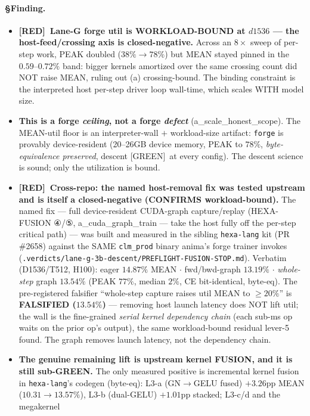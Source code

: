 \documentclass[11pt,a4paper]{article}
\providecommand{\tierGreen}{[GREEN]}
\providecommand{\tierRed}{[RED]}
\begin{document}
\paragraph{§Finding.}
\begin{itemize}\itemsep0.2em
\item \textbf{\tierRed\ Lane-G forge util is WORKLOAD-BOUND at $d1536$ --- the
host-feed/crossing axis is closed-negative.} Across an $8\times$ sweep of per-step
work, PEAK doubled ($38\%\to78\%$) but MEAN stayed pinned in the $0.59$--$0.72\%$
band: bigger kernels amortized over the same crossing count did NOT raise MEAN,
ruling out (a) crossing-bound. The binding constraint is the interpreted host
per-step driver loop wall-time, which scales WITH model size.
\item \textbf{This is a forge \emph{ceiling}, not a forge \emph{defect}}
(a\_scale\_honest\_scope). The MEAN-util floor is an interpreter-wall $+$
workload-size artifact: \texttt{forge} is provably device-resident (20--26GB device
memory, PEAK to $78\%$, \emph{byte-equivalence preserved}, descent \tierGreen\ at
every config). The descent science is sound; only the utilization is bound.
\item \textbf{\tierRed\ Cross-repo: the named host-removal fix was tested upstream
and is itself a closed-negative (CONFIRMS workload-bound).} The named fix --- full
device-resident CUDA-graph capture/replay (HEXA-FUSION ④/⑤,
a\_cuda\_graph\_train --- take the host fully off the per-step critical path) --- was
built and measured in the sibling \texttt{hexa-lang} kit (PR \#2658) against the SAME
\texttt{clm\_prod} binary anima's forge trainer invokes
(\texttt{.verdicts/lane-g-3b-descent/PREFLIGHT-FUSION-STOP.md}). Verbatim (D1536/T512,
H100): eager $14.87\%$ MEAN $\cdot$ fwd/bwd-graph $13.19\%$ $\cdot$ \emph{whole-step}
graph $13.54\%$ (PEAK $77\%$, median $2\%$, CE bit-identical, byte-eq). The
pre-registered falsifier ``whole-step capture raises util MEAN to $\ge20\%$'' is
\textbf{FALSIFIED ($13.54\%$)} --- removing host launch latency does NOT lift util;
the wall is the fine-grained \emph{serial kernel dependency chain} (each sub-ms op
waits on the prior op's output), the same workload-bound residual lever-5 found. The
graph removes launch latency, not the dependency chain.
\item \textbf{The genuine remaining lift is upstream kernel FUSION, and it is still
sub-GREEN.} The only measured positive is incremental kernel fusion in
\texttt{hexa-lang}'s codegen (byte-eq): L3-a (GN$\to$GELU fused) $+3.26$pp MEAN
($10.31\to13.57\%$), L3-b (dual-GELU) $+1.01$pp stacked; L3-c/d and the megakernel

\end{itemize}
\end{document}
